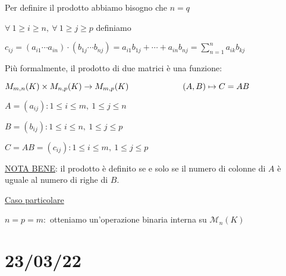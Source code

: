 \documentclass{article}
\newcommand{\ul}[1]{\underline{#1}}
\newcommand{\M}{\mathcal{M}}
\begin{document}
{\begin{itemize}
	    Per definire il prodotto abbiamo bisogno che $n=q$

	    $\forall\ 1\ge i\ge n,\ \forall\ 1\ge j\ge p$ definiamo

	    $c_{ij}=(a_{i1}\cdots a_{in})\cdot(b_{1j}\cdots b_{nj})=a_{i1}b_{1j}+\cdots+a_{in}b_{nj}=\sum^n_{n=1}{a_{ik}b_{kj}}$

	    Più formalmente, il prodotto di due matrici è una funzione:

	    $M_{m,n}(K)\times M_{n,p}(K)\rightarrow M_{m,p}(K)\\\hspace*{6.5em}(A,B)\mapsto C=AB$

	    $A=(a_{ij}): 1\le i\le m,\ 1\le j\le n$

	    $B=(b_{ij}): 1\le i\le n,\ 1\le j\le p$

	    $C=AB=(c_{ij}): 1\le i\le m,\ 1\le j\le p$

	    \ul{NOTA BENE}: il prodotto è definito se e solo se il numero di colonne di $A$ è uguale al numero di righe di $B$.

	    \ul{Caso particolare}

	    $n=p=m:$ otteniamo un'operazione binaria interna su $\M_n(K)$
	\end{itemize}
}
\section{23/03/22}
\end{document}
